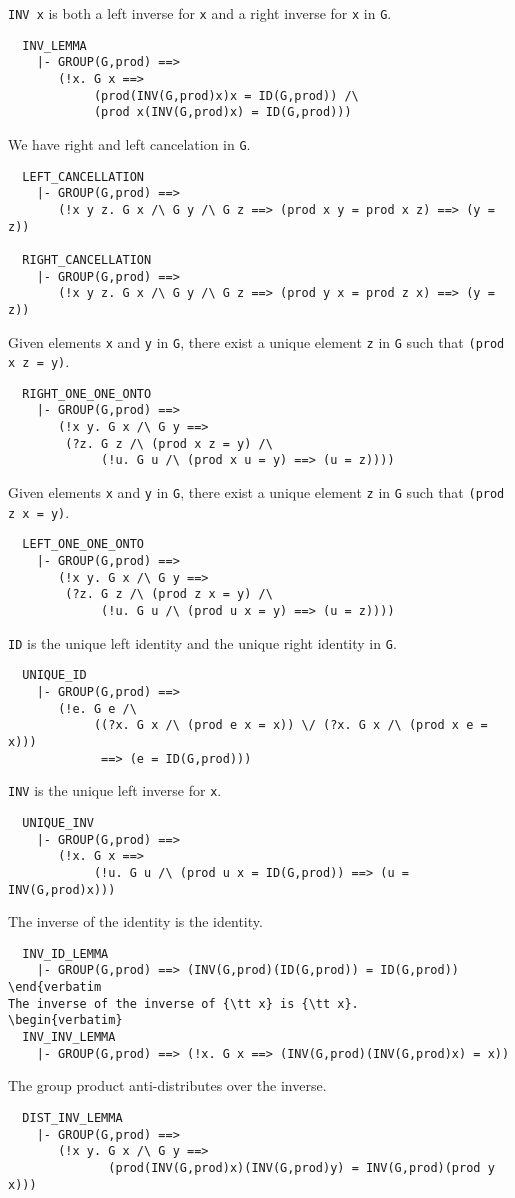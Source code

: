 {\tt INV x} is both a left inverse for {\tt x} and a right inverse for {\tt x}
in {\tt G}.
\begin{verbatim}
  INV_LEMMA
    |- GROUP(G,prod) ==>
       (!x. G x ==>
            (prod(INV(G,prod)x)x = ID(G,prod)) /\
            (prod x(INV(G,prod)x) = ID(G,prod)))

\end{verbatim}
We have right and left cancelation in {\tt G}.
\begin{verbatim}
  LEFT_CANCELLATION
    |- GROUP(G,prod) ==>
       (!x y z. G x /\ G y /\ G z ==> (prod x y = prod x z) ==> (y = z))

  RIGHT_CANCELLATION
    |- GROUP(G,prod) ==>
       (!x y z. G x /\ G y /\ G z ==> (prod y x = prod z x) ==> (y = z))

\end{verbatim}
Given elements {\tt x} and {\tt y} in {\tt G}, there exist a unique
element {\tt z} in {\tt G} such that \mbox{\tt (prod x z = y)}.
\begin{verbatim}
  RIGHT_ONE_ONE_ONTO
    |- GROUP(G,prod) ==>
       (!x y. G x /\ G y ==>
        (?z. G z /\ (prod x z = y) /\ 
             (!u. G u /\ (prod x u = y) ==> (u = z))))

\end{verbatim}
Given elements {\tt x} and {\tt y} in {\tt G}, there exist a unique
element {\tt z} in {\tt G} such that \mbox{\tt (prod z x = y)}.
\begin{verbatim}
  LEFT_ONE_ONE_ONTO
    |- GROUP(G,prod) ==>
       (!x y. G x /\ G y ==>
        (?z. G z /\ (prod z x = y) /\ 
             (!u. G u /\ (prod u x = y) ==> (u = z))))

\end{verbatim}
{\tt ID} is the unique left identity and the unique right identity in {\tt G}.
\begin{verbatim}
  UNIQUE_ID
    |- GROUP(G,prod) ==>
       (!e. G e /\
            ((?x. G x /\ (prod e x = x)) \/ (?x. G x /\ (prod x e = x)))
             ==> (e = ID(G,prod)))

\end{verbatim}
{\tt INV} is the unique left inverse for {\tt x}.
\begin{verbatim}
  UNIQUE_INV
    |- GROUP(G,prod) ==>
       (!x. G x ==>
            (!u. G u /\ (prod u x = ID(G,prod)) ==> (u = INV(G,prod)x)))

\end{verbatim}
The inverse of the identity is the identity.
\begin{verbatim}
  INV_ID_LEMMA
    |- GROUP(G,prod) ==> (INV(G,prod)(ID(G,prod)) = ID(G,prod))
\end{verbatim
The inverse of the inverse of {\tt x} is {\tt x}.
\begin{verbatim}
  INV_INV_LEMMA
    |- GROUP(G,prod) ==> (!x. G x ==> (INV(G,prod)(INV(G,prod)x) = x))

\end{verbatim}
The group product anti-distributes over the inverse.
\begin{verbatim}
  DIST_INV_LEMMA
    |- GROUP(G,prod) ==>
       (!x y. G x /\ G y ==>
              (prod(INV(G,prod)x)(INV(G,prod)y) = INV(G,prod)(prod y x)))
\end{verbatim}